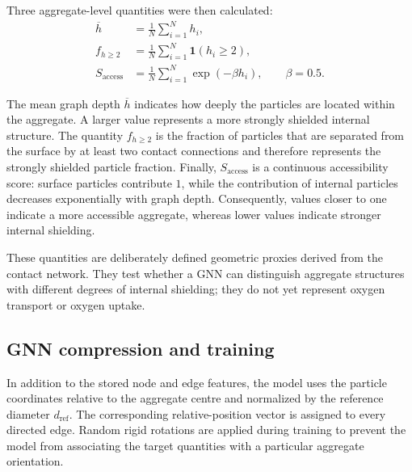 \documentclass[12pt,a4paper]{article}
\begin{document}
Three aggregate-level quantities were then calculated:
\begin{align}
	\overline{h} &= \frac{1}{N}\sum_{i=1}^{N}h_i,\\
	f_{h\geq2} &= \frac{1}{N}\sum_{i=1}^{N}\mathbf{1}(h_i\geq2),\\
	S_{\mathrm{access}} &= \frac{1}{N}\sum_{i=1}^{N}\exp(-\beta h_i),
	\qquad \beta=0.5.
\end{align}

The mean graph depth \(\overline{h}\) indicates how deeply the particles are
located within the aggregate. A larger value represents a more strongly
shielded internal structure. The quantity \(f_{h\geq2}\) is the fraction of
particles that are separated from the surface by at least two contact
connections and therefore represents the strongly shielded particle fraction.
Finally, \(S_{\mathrm{access}}\) is a continuous accessibility score: surface
particles contribute \(1\), while the contribution of internal particles
decreases exponentially with graph depth. Consequently, values closer to one
indicate a more accessible aggregate, whereas lower values indicate stronger
internal shielding.

These quantities are deliberately defined geometric proxies derived from the
contact network. They test whether a GNN can distinguish aggregate structures
with different degrees of internal shielding; they do not yet represent oxygen
transport or oxygen uptake.

\subsection{GNN compression and training}

In addition to the stored node and edge features, the model uses the particle
coordinates relative to the aggregate centre and normalized by the reference
diameter $d_{\mathrm{ref}}$. The corresponding relative-position vector is
assigned to every directed edge. Random rigid rotations are applied during
training to prevent the model from associating the target quantities with a
particular aggregate orientation.
\end{document}
